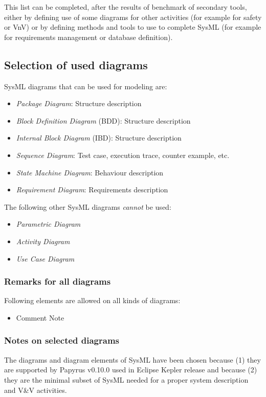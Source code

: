 This list can be completed, after the results of benchmark  of secondary tools, either by defining use of some diagrams for other activities (for example for safety or VnV) or by defining methods and tools to use to complete SysML (for example for requirements management or database definition).

\subsection{Selection of used diagrams}

SysML diagrams that can be used for modeling are:
\begin{itemize}
\item \emph{Package Diagram}: Structure description
\item \emph{Block Definition Diagram} (BDD): Structure description
\item \emph{Internal Block Diagram} (IBD): Structure description
\item \emph{Sequence Diagram}: Test case, execution trace, counter
  example, etc.
\item \emph{State Machine Diagram}: Behaviour description
\item \emph{Requirement Diagram}: Requirements description
\end{itemize}

The following other SysML diagrams \emph{cannot} be used:
\begin{itemize}
\item \emph{Parametric Diagram}
\item \emph{Activity Diagram}
\item \emph{Use Case Diagram}
\end{itemize}

\subsubsection{Remarks for all diagrams}

Following elements are allowed on all kinds of diagrams:
\begin{itemize}
\item Comment Note
\end{itemize}

\subsubsection{Notes on selected diagrams}

The diagrams and diagram elements of SysML have been chosen because
(1) they are supported by Papyrus v0.10.0 used in Eclipse Kepler
release and because (2) they are the minimal subset of SysML needed
for a proper system description and V\&V activities.

